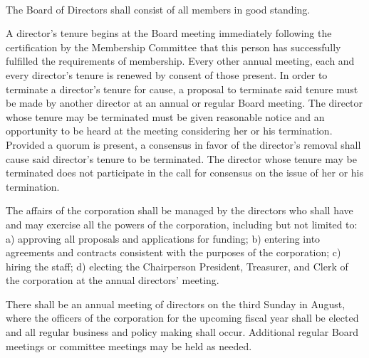 \begin{art} ~

\begin{asec}[Number]
 
The Board of Directors shall consist of all members
in good standing.

\end{asec}


\begin{asec}

A director's tenure begins at the Board meeting immediately
following the certification by the Membership Committee that this
person has successfully fulfilled the requirements of membership.
Every other annual meeting, each and every director's tenure is
renewed by consent of those present. In order to terminate a
director's tenure for cause, a proposal to terminate said tenure
must be made by another director at an annual or regular Board
meeting.  The director whose tenure may be terminated must be
given reasonable notice and an opportunity to be heard at the
meeting considering her or his termination.  Provided a quorum is
present, a consensus in favor of the director's removal shall
cause said director's tenure to be terminated.  The director whose
tenure may be terminated does not participate in the call for
consensus on the issue of her or his termination.

\end{asec}

\begin{asec}

The affairs of the corporation shall be managed by the directors
who shall have and may exercise all the powers of the corporation,
including but not limited to: a) approving all proposals and
applications for funding; b) entering into agreements and
contracts consistent with the purposes of the corporation; c)
hiring the staff; d) electing the Chairperson President,
Treasurer, and Clerk of the corporation at the annual directors'
meeting.

\end{asec}

\begin{asec}

There shall be an annual meeting of directors on the third Sunday
in August, where the officers of the corporation for the upcoming
fiscal year shall be elected and all regular business and policy
making shall occur.  Additional regular Board meetings or
committee meetings may be held as needed.


\end{asec}
\end{art}
